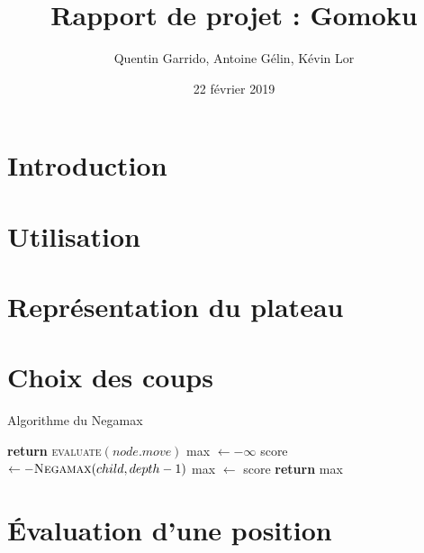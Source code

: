 \documentclass{article}
\title{Rapport de projet : Gomoku}
\author{Quentin Garrido, Antoine Gélin, Kévin Lor}
\date{22 février 2019}
\begin{document}
\maketitle

\section{Introduction}

\pagebreak
\section{Utilisation}

\pagebreak
\section{Représentation du plateau}

\pagebreak
\section{Choix des coups}

\begin{algorithm}
\caption{Algorithme du Negamax}\label{negamax}
\begin{algorithmic}[1]
		\State \textbf{return} \textsc{evaluate}$(node.move)$
	\EndIf
	\State max $\gets -\infty$
		\State score $\gets -\textsc{Negamax}(child, depth -1)$
			\State max $\gets$ score
		\EndIf
	\EndFor
	\State \textbf{return} max
\EndProcedure
\end{algorithmic}
\end{algorithm}


\pagebreak
\section{Évaluation d'une position}
\end{document}
